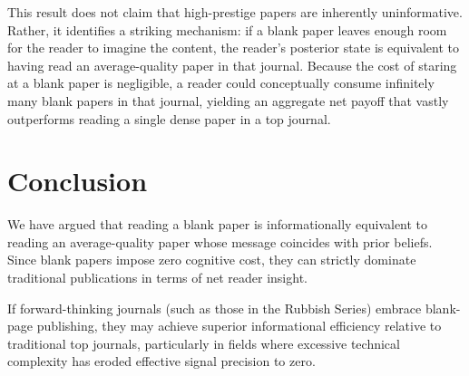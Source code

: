 \documentclass[AER]{AEA}
\DeclareRobustCommand{\AERlink}[1]{}
\begin{document}
This result does not claim that high-prestige papers are inherently uninformative. Rather, it identifies a striking mechanism: if a blank paper leaves enough room for the reader to imagine the content, the reader's posterior state is equivalent to having read an average-quality paper in that journal. Because the cost of staring at a blank paper is negligible, a reader could conceptually consume infinitely many blank papers in that journal, yielding an aggregate net payoff that vastly outperforms reading a single dense paper in a top journal.

\section{Conclusion}

We have argued that reading a blank paper is informationally equivalent to reading an average-quality paper whose message coincides with prior beliefs. Since blank papers impose zero cognitive cost, they can strictly dominate traditional publications in terms of net reader insight.

If forward-thinking journals (such as those in the Rubbish Series) embrace blank-page publishing, they may achieve superior informational efficiency relative to traditional top journals, particularly in fields where excessive technical complexity has eroded effective signal precision to zero.

\FloatBarrier

\DeclareRobustCommand{\AERlink}[1]{\makebox[0pt][r]{\href{#1}{\color{blue}$\blacktriangleright$}\hspace{0.3em}}}



\end{document}
